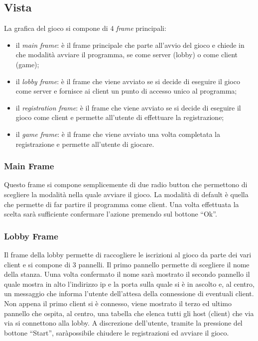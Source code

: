 \subsection{Vista}
La grafica del gioco si compone di 4 \textit{frame} principali:
\begin{itemize}
	\item il \textit{main frame}: è il frame principale che parte all'avvio del
	gioco e chiede in che modalità avviare il programma, se come server (lobby)
	o come client (game);
	\item il \textit{lobby frame}: è il frame che viene avviato se si decide di
	eseguire il gioco come server e fornisce ai client un punto di accesso unico
	al programma;
	\item il \textit{registration frame}: è il frame che viene avviato se si
	decide di eseguire il gioco come client e permette all'utente di effettuare
	la registrazione;
	\item il \textit{game frame}: è il frame che viene avviato una volta
	completata la registrazione e permette all'utente di giocare.
\end{itemize}



\subsubsection{Main Frame}
\label{subsubsection:progettazione_main_frame}
Questo frame si compone semplicemente di due radio button che permettono di
scegliere la modalità nella quale avviare il gioco. La modalità di default è
quella che permette di far partire il programma come client. Una volta
effettuata la scelta sarà sufficiente confermare l'azione premendo sul bottone
``Ok''.



\subsubsection{Lobby Frame}
\label{subsubsection:progettazione_lobby_frame}
Il frame della lobby permette di raccogliere le iscrizioni al gioco da parte dei
vari client e si compone di 3 pannelli.\newline
Il primo pannello permette di scegliere il nome della stanza. Uuna volta
confermato il nome sarà mostrato il secondo pannello il quale mostra in alto
l'indirizzo ip e la porta sulla quale si è in ascolto e, al centro, un messaggio
che informa l'utente dell'attesa della connessione di eventuali client. Non
appena il primo client si è connesso, viene mostrato il terzo ed ultimo pannello
che ospita, al centro, una tabella che elenca tutti gli host (client) che via
via si connettono alla lobby. A discrezione dell'utente, tramite la pressione
del bottone ``Start'', saràpossibile chiudere le registrazioni ed avviare il
gioco.



